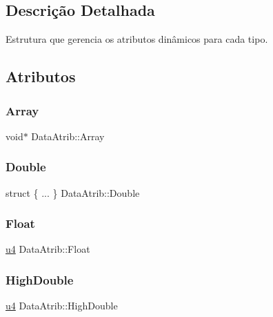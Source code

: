 \subsection{Descrição Detalhada}
Estrutura que gerencia os atributos dinâmicos para cada tipo. 

\subsection{Atributos}
\mbox{\label{unionDataAtrib_a1cd92c3acf2b8cbe2889f0b766661f1d}} 
\subsubsection{\texorpdfstring{Array}{Array}}
{\footnotesize\ttfamily void$\ast$ Data\+Atrib\+::\+Array}

\mbox{\label{unionDataAtrib_a3be5309079282250f66331e13f32ad46}} 
\subsubsection{\texorpdfstring{Double}{Double}}
{\footnotesize\ttfamily struct \{ ... \}  Data\+Atrib\+::\+Double}

\mbox{\label{unionDataAtrib_abf1cacd5fc8d6219aa5bea2dc474f89a}} 
\subsubsection{\texorpdfstring{Float}{Float}}
{\footnotesize\ttfamily \hyperlink{ClassLoader_8h_aedf6ddc03df8caaaccbb4c60b9a9b850}{u4} Data\+Atrib\+::\+Float}

\mbox{\label{unionDataAtrib_ae701e4461c45e996636b301026eec3e1}} 
\subsubsection{\texorpdfstring{High\+Double}{HighDouble}}
{\footnotesize\ttfamily \hyperlink{ClassLoader_8h_aedf6ddc03df8caaaccbb4c60b9a9b850}{u4} Data\+Atrib\+::\+High\+Double}

